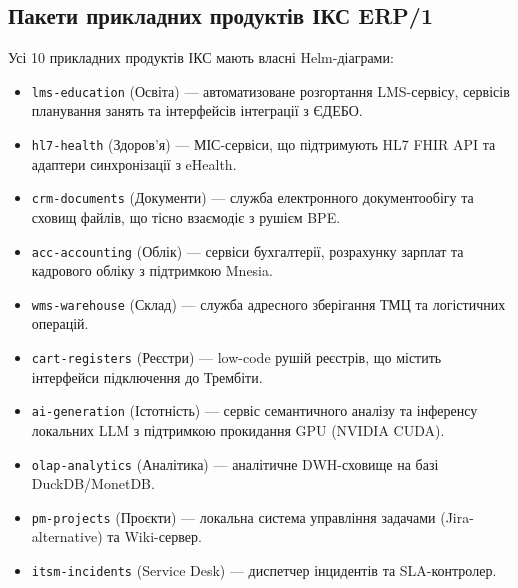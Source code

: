 \documentclass{article}
\begin{document}
\subsection{Пакети прикладних продуктів ІКС ERP/1}
Усі 10 прикладних продуктів ІКС мають власні Helm-діаграми:
\begin{itemize}
    \item \texttt{lms-education} (Освіта) --- автоматизоване розгортання LMS-сервісу, сервісів планування занять та інтерфейсів інтеграції з ЄДЕБО.
    \item \texttt{hl7-health} (Здоров'я) --- МІС-сервіси, що підтримують HL7 FHIR API та адаптери синхронізації з eHealth.
    \item \texttt{crm-documents} (Документи) --- служба електронного документообігу та сховищ файлів, що тісно взаємодіє з рушієм BPE.
    \item \texttt{acc-accounting} (Облік) --- сервіси бухгалтерії, розрахунку зарплат та кадрового обліку з підтримкою Mnesia.
    \item \texttt{wms-warehouse} (Склад) --- служба адресного зберігання ТМЦ та логістичних операцій.
    \item \texttt{cart-registers} (Реєстри) --- low-code рушій реєстрів, що містить інтерфейси підключення до Трембіти.
    \item \texttt{ai-generation} (Істотність) --- сервіс семантичного аналізу та інференсу локальних LLM з підтримкою прокидання GPU (NVIDIA CUDA).
    \item \texttt{olap-analytics} (Аналітика) --- аналітичне DWH-сховище на базі DuckDB/MonetDB.
    \item \texttt{pm-projects} (Проєкти) --- локальна система управління задачами (Jira-alternative) та Wiki-сервер.
    \item \texttt{itsm-incidents} (Service Desk) --- диспетчер інцидентів та SLA-контролер.
\end{itemize}
\end{document}
